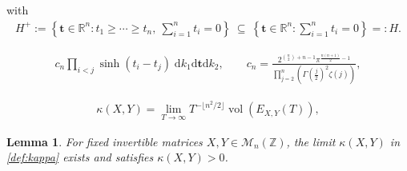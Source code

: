 \documentclass[10pt,a4paper]{amsart}
\newtheorem{lem}{Lemma}
\def \R {{\mathbb R}}
\def \Z {{\mathbb Z}}
\newcommand{\vol}{\operatorname{vol}}
\begin{document}
    with     \begin{align}\label{eq:defH+}
  H^{+} := 
 \left \{
  \mathbf{t} \in \R^n : t_1 \ge \cdots \ge t_n , \ \sum_{i=1}^n t_i = 0
 \right  \} \ \subseteq \
 \left \{ 
         \mathbf{t} \in \R^n : \sum_{i=1}^n t_i = 0
         \right \} =: H .
     \end{align} 

  \begin{align}\label{eq:cartanvol}
  c_n \prod_{i<j} \sinh(t_i - t_j) \;
      \mathrm{d}k_1
      \mathrm{d} \mathbf{t}
      \mathrm{d}k_2
      , \qquad
      c_n =  
      \frac{
      2^{\binom{n}{2}+n-1} \pi^{\frac{n(n+1)}{2}-1}
      }{ \prod_{j=2}^n
       (\Gamma(\tfrac{j}{2})^{2} \zeta(j))
      },
  \end{align} 

\begin{align}\label{def:kappa}
    \kappa(X,Y) = \lim_{T \to \infty} 
   T^{-\lfloor n^2/2 \rfloor} \vol (E_{X,Y}(T)),
\end{align}

\begin{lem}\label{lem:volumecomputation}
    For fixed invertible matrices $X,Y \in \mathcal{M}_{n}(\Z)$, the limit $\kappa (X,Y)$ in
    \eqref{def:kappa} exists and satisfies $\kappa (X,Y)>0$.
\end{lem}
\end{document}
